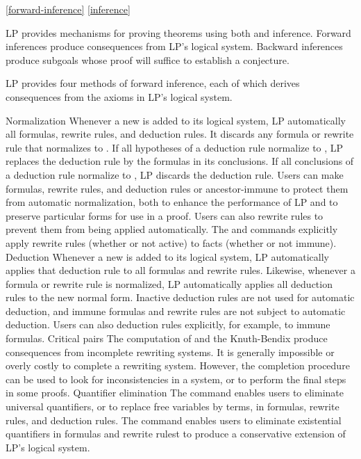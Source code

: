 \ref{forward-inference}
\ref{inference}

LP provides mechanisms for proving theorems using both 
and  inference.  Forward inferences produce
consequences from LP's logical system.  Backward inferences produce subgoals
whose proof will suffice to establish a conjecture.

LP provides four methods of forward inference, each of which derives
consequences from the axioms in LP's logical system.
\begin{description}
\dt Normalization
\dd
Whenever a new  is added to its logical
system, LP automatically  all formulas,
rewrite rules, and deduction rules.  It discards any formula or rewrite rule
that normalizes to .  If all hypotheses of a deduction rule normalize
to , LP replaces the deduction rule by the formulas in its
conclusions.  If all conclusions of a deduction rule normalize to , LP
discards the deduction rule.
\p
Users can make formulas, rewrite rules, and deduction rules
 or ancestor-immune to protect them from 
automatic normalization, both to enhance the performance of LP and to preserve
particular forms for use in a proof.  Users can also
 rewrite rules to prevent them from 
being applied automatically.  The  and 
commands explicitly apply rewrite rules (whether or not active) to facts
(whether or not immune).
\p
\dt Deduction
\dd
Whenever a new  is added to its logical
system, LP automatically applies that deduction rule to all formulas and
rewrite rules.  Likewise, whenever a formula or rewrite rule is normalized, LP
automatically applies all deduction rules to the new normal form.  
\p
Inactive deduction rules are not used for automatic deduction, and immune
formulas and rewrite rules are not subject to automatic deduction.  Users can
also  deduction rules explicitly, for example, to immune formulas.
\p
\dt Critical pairs
\dd
The computation of  and the Knuth-Bendix
 produce consequences from 
incomplete rewriting systems.  It is generally impossible or overly costly to
complete a rewriting system.  However, the completion procedure can be used to
look for inconsistencies in a system, or to perform the final steps in some
proofs.
\p
\dt Quantifier elimination
\dd
The  command enables users to eliminate universal
quantifiers, or to replace free variables by terms, in formulas, rewrite rules,
and deduction rules.  The  command enables users to eliminate
existential quantifiers in formulas and rewrite rulest to produce a
conservative extension of LP's logical system.
\end{description}
